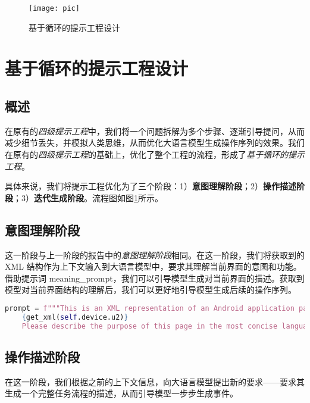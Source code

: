 \documentclass{article}
\begin{document}
\begin{figure}[h!]
    \centering
    \texttt{[image: pic]}
    \caption{基于循环的提示工程设计}
    \label{fig:flow}
\end{figure}

\section{基于循环的提示工程设计}

\subsection{概述}

在原有的\textit{四级提示工程}中，我们将一个问题拆解为多个步骤、逐渐引导提问，从而减少细节丢失，并模拟人类思维，从而优化大语言模型生成操作序列的效果。我们在原有的\textit{四级提示工程}的基础上，优化了整个工程的流程，形成了\textit{基于循环的提示工程}。

具体来说，我们将提示工程优化为了三个阶段：1）\textbf{意图理解阶段}；2）\textbf{操作描述阶段}；3）\textbf{迭代生成阶段}。流程图如图\ref{fig:flow}所示。

\subsection{意图理解阶段}

这一阶段与上一阶段的报告中的\textit{意图理解阶段}相同。在这一阶段，我们将获取到的 XML 结构作为上下文输入到大语言模型中，要求其理解当前界面的意图和功能。借助提示词 meaning\_prompt，我们可以引导模型生成对当前界面的描述。获取到模型对当前界面结构的理解后，我们可以更好地引导模型生成后续的操作序列。

\newpage

\begin{lstlisting}[language=python, caption=意图理解]
    prompt = f"""This is an XML representation of an Android application page:
    {get_xml(self.device.u2)}
    Please describe the purpose of this page in the most concise language possible."""
\end{lstlisting}

\subsection{操作描述阶段}

在这一阶段，我们根据之前的上下文信息，向大语言模型提出新的要求——要求其生成一个完整任务流程的描述，从而引导模型一步步生成事件。
\end{document}
